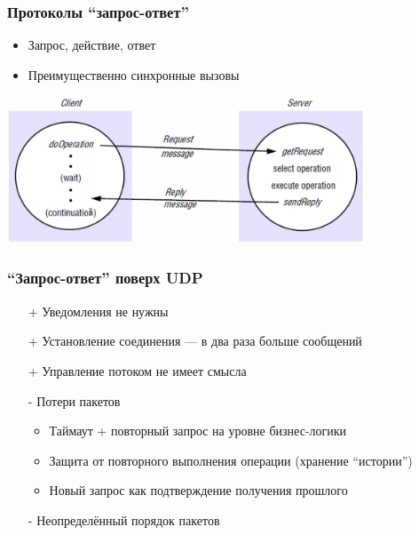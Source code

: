\documentclass[xetex,mathserif,serif]{beamer}
\begin{document}
	\begin{frame}
		\frametitle{Протоколы ``запрос-ответ''}
		\begin{itemize}
			\item Запрос, действие, ответ
			\item Преимущественно синхронные вызовы
		\end{itemize}
		\begin{center}
			\includegraphics[width=0.8\textwidth]{requestReplyProtocols.png}
		\end{center}
	\end{frame}

	\begin{frame}
		\frametitle{``Запрос-ответ'' поверх UDP}
		\begin{itemize}
			\item[+] Уведомления не нужны
			\item[+] Установление соединения --- в два раза больше сообщений
			\item[+] Управление потоком не имеет смысла
			\item[-] Потери пакетов
			\begin{itemize}
				\item Таймаут + повторный запрос на уровне бизнес-логики
				\item Защита от повторного выполнения операции (хранение ``истории'')
				\item Новый запрос как подтверждение получения прошлого
			\end{itemize}
			\item[-] Неопределённый порядок пакетов
		\end{itemize}
	\end{frame}
\end{document}
